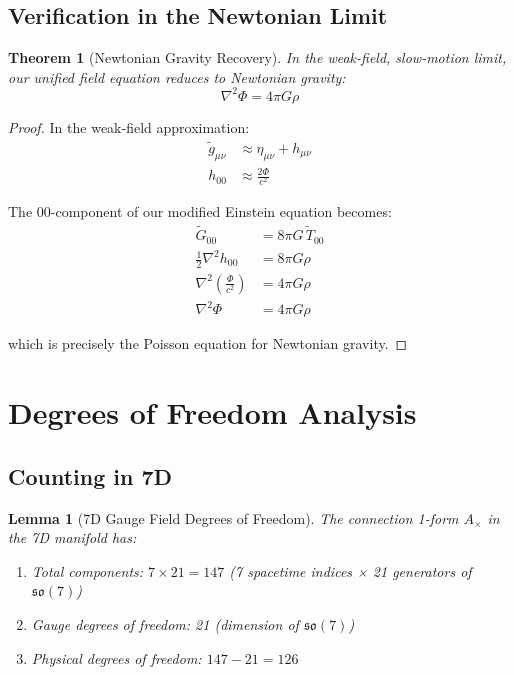 \documentclass{article}
\newcommand{\tl}[1]{\tilde{#1}}
\newtheorem{theorem}{Theorem}
\newtheorem{lemma}{Lemma}
\begin{document}
\subsection{Verification in the Newtonian Limit}

\begin{theorem}[Newtonian Gravity Recovery]
In the weak-field, slow-motion limit, our unified field equation reduces to Newtonian gravity:
\begin{equation}
\nabla^2\Phi = 4\pi G \rho
\end{equation}
\end{theorem}

\begin{proof}
In the weak-field approximation:
\begin{align}
\tl{g}_{\mu\nu} &\approx \eta_{\mu\nu} + h_{\mu\nu} \\
h_{00} &\approx \frac{2\Phi}{c^2}
\end{align}

The 00-component of our modified Einstein equation becomes:
\begin{align}
\tl{G}_{00} &= 8\pi G \, \tl{T}_{00} \\
\frac{1}{2}\nabla^2 h_{00} &= 8\pi G \rho \\
\nabla^2 \left(\frac{\Phi}{c^2}\right) &= 4\pi G \rho \\
\nabla^2 \Phi &= 4\pi G \rho
\end{align}

which is precisely the Poisson equation for Newtonian gravity.
\end{proof}

\section{Degrees of Freedom Analysis}

\subsection{Counting in 7D}

\begin{lemma}[7D Gauge Field Degrees of Freedom]
The connection 1-form $A_{\times}$ in the 7D manifold has:
\begin{enumerate}
\item Total components: $7 \times 21 = 147$ (7 spacetime indices × 21 generators of $\mathfrak{so}(7)$)
\item Gauge degrees of freedom: 21 (dimension of $\mathfrak{so}(7)$)
\item Physical degrees of freedom: $147 - 21 = 126$
\end{enumerate}
\end{lemma}
\end{document}
